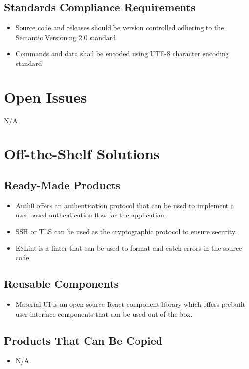\documentclass[12pt]{article}
\begin{document}
\subsection{Standards Compliance Requirements}
\begin{itemize}
    \item Source code and releases should be version controlled adhering to the Semantic Versioning 2.0 standard
    \item Commands and data shall be encoded using UTF-8 character encoding standard
\end{itemize}

\section{Open Issues}
N/A

\section{Off-the-Shelf Solutions}
\subsection{Ready-Made Products}
\begin{itemize}
    \item Auth0 offers an authentication protocol that can be used to implement a user-based authentication flow for the application.
    \item SSH or TLS can be used as the cryptographic protocol to ensure security.
    \item ESLint is a linter that can be used to format and catch errors in the source code.
\end{itemize}

\subsection{Reusable Components}
\begin{itemize}
    \item Material UI is an open-source React component library which offers prebuilt user-interface components that can be used out-of-the-box.
\end{itemize}
\subsection{Products That Can Be Copied}
\begin{itemize}
    \item N/A
\end{itemize}
\end{document}
